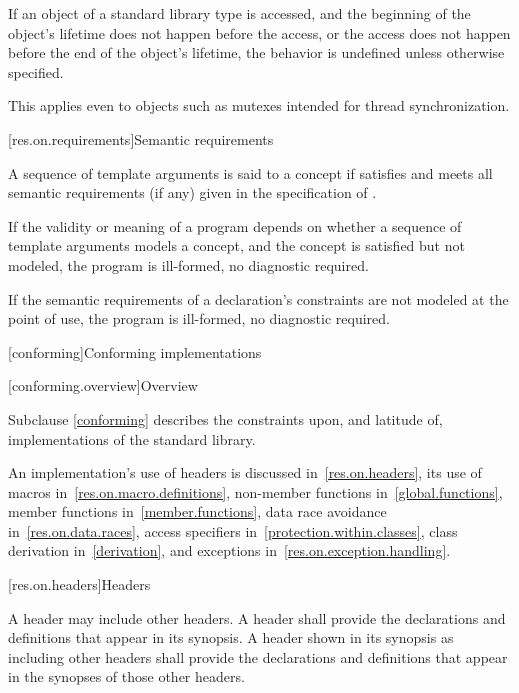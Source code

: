 \pnum
If an object of a standard library type is accessed, and
the beginning of the object's lifetime
does not happen before the access, or
the access does not happen before the end of the object's lifetime,
the behavior is undefined unless otherwise specified.
\begin{note}
This applies even to objects such as mutexes intended for thread synchronization.
\end{note}

[res.on.requirements]{Semantic requirements}

\pnum
A sequence  of template arguments is said to
%
 a concept 
if 
satisfies  and
meets all semantic requirements (if any)
given in the specification of .

\pnum
If the validity or meaning of a program
depends on whether a sequence of template arguments models a concept, and
the concept is satisfied but not modeled,
the program is ill-formed, no diagnostic required.

\pnum
If the semantic requirements of a declaration's
constraints are not modeled at the point of use,
the program is ill-formed, no diagnostic required.

[conforming]{Conforming implementations}

[conforming.overview]{Overview}

\pnum
Subclause \ref{conforming} describes the constraints upon, and latitude of, implementations of the \Cpp{} standard library.

\pnum
An implementation's use of headers is discussed in~\ref{res.on.headers}, its use
of macros in~\ref{res.on.macro.definitions}, non-member functions
in~\ref{global.functions}, member functions in~\ref{member.functions}, data race
avoidance in~\ref{res.on.data.races}, access specifiers
in~\ref{protection.within.classes}, class derivation in~\ref{derivation}, and
exceptions in~\ref{res.on.exception.handling}.

[res.on.headers]{Headers}

\pnum
A \Cpp{} header may include other \Cpp{} headers.
A \Cpp{} header shall provide the declarations and definitions that appear in its
synopsis. A \Cpp{} header shown in its synopsis as including other \Cpp{} headers
shall provide the declarations and definitions that appear in the synopses of
those other headers.

